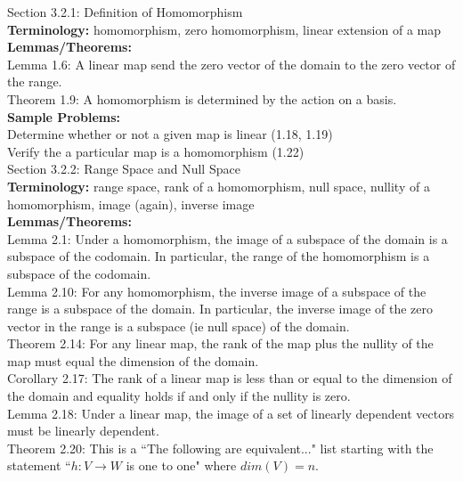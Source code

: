 \documentclass[11pt,fleqn]{article}
\begin{document}
\noindent Section 3.2.1: Definition of Homomorphism \\

\textbf{Terminology:} homomorphism, zero homomorphism, linear extension of a map\\

\textbf{Lemmas/Theorems:} \\
Lemma 1.6: A linear map send the zero vector of the domain to the zero vector of the range.\\
Theorem 1.9: A homomorphism is determined by the action on a basis. \\

\textbf{Sample Problems:} \\
Determine whether or not a given map is linear (1.18, 1.19)\\
Verify the a particular map is a  homomorphism (1.22)\\

\noindent Section 3.2.2:  Range Space and Null Space\\

\textbf{Terminology:} range space, rank of a homomorphism, null space, nullity of a homomorphism, image (again), inverse image\\

\textbf{Lemmas/Theorems:} \\
Lemma 2.1: Under a homomorphism, the image of a subspace of the domain is a subspace of the codomain. In particular, the range of the homomorphism is a subspace of the codomain.\\
Lemma 2.10: For any homomorphism, the inverse image of a subspace of the range is a subspace of the domain. In particular, the inverse image of the zero vector in the range is a subspace (ie null space) of the domain.\\
Theorem 2.14: For any linear map, the rank of the map plus the nullity of the map must equal the dimension of the domain.\\
Corollary 2.17: The rank of a linear map is less than or equal to the dimension of the domain and equality holds if and only if the nullity is zero.\\
Lemma 2.18: Under a linear map, the image of a set of linearly dependent vectors must be linearly dependent.\\
Theorem 2.20: This is a ``The following are equivalent..." list starting with the statement ``$h: V \to W$ is one to one" where $dim(V)=n.$\\
\end{document}
